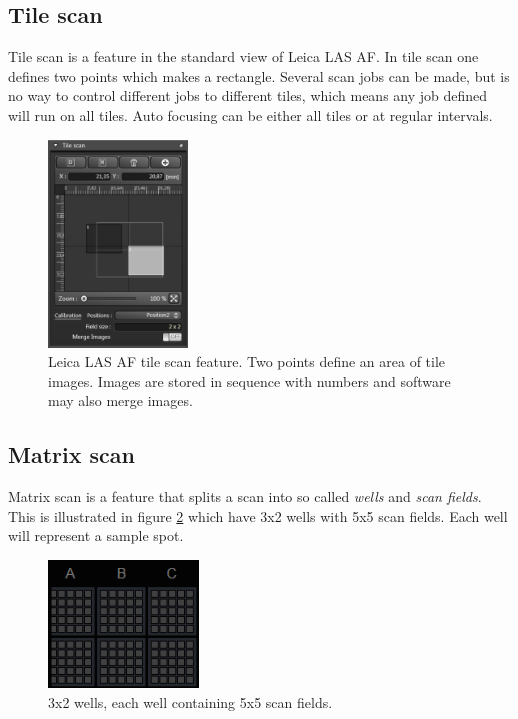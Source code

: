 \subsection{Tile scan}
Tile scan is a feature in the standard view of Leica LAS AF. In tile scan one defines two points which makes a rectangle. Several scan jobs can be made, but is no way to control different jobs to different tiles, which means any job defined will run on all tiles. Auto focusing can be either all tiles or at regular intervals.

\begin{figure}[h]
\centering
\includegraphics[width=0.33\textwidth]{tilescan}
\caption{Leica LAS AF tile scan feature. Two points define an area of tile images. Images are stored in sequence with numbers and software may also merge images.}
\label{fig:tilescan}
\end{figure}


\subsection{Matrix scan}
Matrix scan is a feature that splits a scan into so called \textit{wells} and \textit{scan fields}. This is illustrated in figure \ref{fig:wells} which have 3x2 wells with 5x5 scan fields. Each well will represent a sample spot.

\begin{figure}[h]
\centering
\includegraphics[width=4cm]{wells}
\caption{3x2 wells, each well containing 5x5 scan fields.}
\label{fig:wells}
\end{figure}

